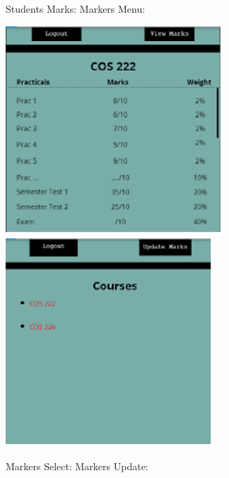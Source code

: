 \documentclass{article}
\begin{document}
\noindent 

  Students Marks:     Markers Menu:

\noindent \includegraphics*[width=3.21in, height=3.07in, keepaspectratio=false]{image3}  \includegraphics*[width=3.06in, height=3.06in, keepaspectratio=false]{image4}

\noindent 

\noindent 

\noindent 

\noindent 

  Markers Select:     Markers Update:
\end{document}
